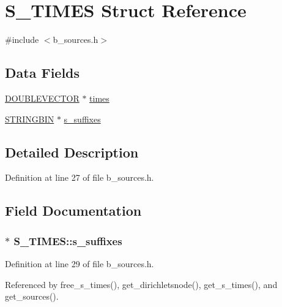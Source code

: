 \hypertarget{struct_s___t_i_m_e_s}{\section{S\-\_\-\-T\-I\-M\-E\-S Struct Reference}
\label{struct_s___t_i_m_e_s}
}


{\ttfamily \#include $<$b\-\_\-sources.\-h$>$}

\subsection*{Data Fields}
\begin{DoxyCompactItemize}
\item 
\hyperlink{struct_d_o_u_b_l_e_v_e_c_t_o_r}{D\-O\-U\-B\-L\-E\-V\-E\-C\-T\-O\-R} $\ast$ \hyperlink{struct_s___t_i_m_e_s_aef6469545d1fb79d7b87cc35465489ce}{times}
\item 
\hyperlink{turtle_8h_ade34e6dff3489a3ddd297f003f01bbd2}{S\-T\-R\-I\-N\-G\-B\-I\-N} $\ast$ \hyperlink{struct_s___t_i_m_e_s_afe9493e121def3e2842815fba61ada0a}{s\-\_\-suffixes}
\end{DoxyCompactItemize}


\subsection{Detailed Description}


Definition at line 27 of file b\-\_\-sources.\-h.



\subsection{Field Documentation}
\hypertarget{struct_s___t_i_m_e_s_afe9493e121def3e2842815fba61ada0a}{
\subsubsection[{s\-\_\-suffixes}]{$\ast$ S\-\_\-\-T\-I\-M\-E\-S\-::s\-\_\-suffixes}}\label{struct_s___t_i_m_e_s_afe9493e121def3e2842815fba61ada0a}


Definition at line 29 of file b\-\_\-sources.\-h.



Referenced by free\-\_\-s\-\_\-times(), get\-\_\-dirichletsnode(), get\-\_\-s\-\_\-times(), and get\-\_\-sources().

